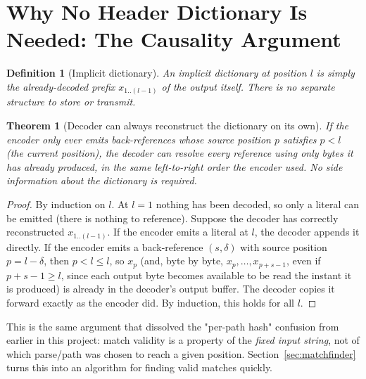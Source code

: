 \documentclass[11pt]{article}
\newtheorem{theorem}{Theorem}
\newtheorem{definition}{Definition}
\begin{document}
\section{Why No Header Dictionary Is Needed: The Causality Argument}
\label{sec:causality}

\begin{definition}[Implicit dictionary]
An implicit dictionary at position $l$ is simply the already-decoded prefix
$x_{1..(l-1)}$ of the output itself. There is no separate structure to store or
transmit.
\end{definition}

\begin{theorem}[Decoder can always reconstruct the dictionary on its own]
\label{thm:causal}
If the encoder only ever emits back-references whose source position $p$ satisfies
$p < l$ (the current position), the decoder can resolve every reference using only
bytes it has \emph{already} produced, in the same left-to-right order the encoder used.
No side information about the dictionary is required.
\end{theorem}

\begin{proof}
By induction on $l$. At $l = 1$ nothing has been decoded, so only a literal can be
emitted (there is nothing to reference). Suppose the decoder has correctly reconstructed
$x_{1..(l-1)}$. If the encoder emits a literal at $l$, the decoder appends it directly.
If the encoder emits a back-reference $(s, \delta)$ with source position
$p = l - \delta$, then $p < l \le l$, so $x_p$ (and, byte by byte, $x_p, \dots,
x_{p+s-1}$, even if $p + s - 1 \ge l$, since each output byte becomes available to be
read the instant it is produced) is already in the decoder's output buffer. The decoder
copies it forward exactly as the encoder did. By induction, this holds for all $l$.
\end{proof}

This is the same argument that dissolved the "per-path hash" confusion from earlier in
this project: match validity is a property of the \emph{fixed input string}, not of
which parse/path was chosen to reach a given position. Section~\ref{sec:matchfinder}
turns this into an algorithm for finding valid matches quickly.
\end{document}
